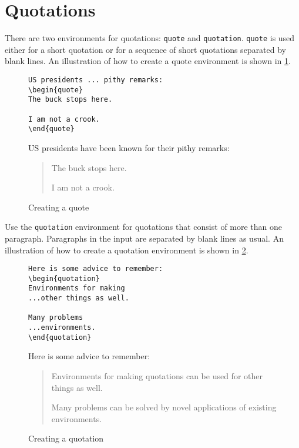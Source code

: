 \section{Quotations}
There are two environments for quotations: {\tt quote}
and {\tt quotation}.
{\tt quote} is used either for a short quotation or for a sequence of
short quotations separated by blank lines.
An illustration of how to create a quote environment is shown in
\ref{fig:quote}.
\begin{figure}
\footnotesize
\begin{minipage}[t]{0.48\textwidth}
\begin{verbatim}
US presidents ... pithy remarks:
\begin{quote}
The buck stops here.
 
I am not a crook.
\end{quote}
\end{verbatim}
\end{minipage}\hfill
\begin{minipage}[t]{0.48\textwidth}
US presidents have been known for their pithy remarks:
\begin{quote}
The buck stops here.
 
I am not a crook.
\end{quote}
\end{minipage}
\vspace{1em}
\caption{Creating a quote}\label{fig:quote}
\end{figure}
 
Use the {\tt quotation} environment for quotations that consist of more
than one paragraph.  Paragraphs in the input are separated by blank
lines as usual.
An illustration of how to create a quotation environment is shown in
\ref{fig:quotation}.
\begin{figure}
\footnotesize
\begin{minipage}[t]{0.48\textwidth}
\begin{verbatim}
Here is some advice to remember:
\begin{quotation}
Environments for making
...other things as well.
 
Many problems
...environments.
\end{quotation}
\end{verbatim}
\end{minipage}\hfill
\begin{minipage}[t]{0.48\textwidth}
Here is some advice to remember:
\begin{quotation}
Environments for making quotations
can be used for other things as well.
 
Many problems can be solved by
novel applications of existing
environments.
\end{quotation}
\end{minipage}
\vspace{1em}
\caption{Creating a quotation}\label{fig:quotation}
\end{figure}
 

